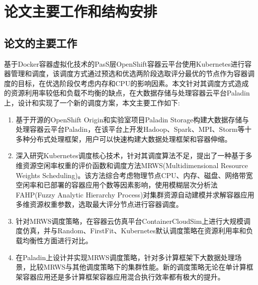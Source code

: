 \section{论文主要工作和结构安排}
\subsection{论文的主要工作}
基于Docker容器虚拟化技术的PasS层OpenShift容器云平台使用Kubernetes进行容器管理和调度，该调度方式通过预选和优选两阶段选取评分最优的节点作为容器调度的目标，在优选阶段仅考虑内存和CPU的影响因素。本文针对其调度方式造成的资源利用率较低和负载不均衡的缺点，在大数据存储与处理容器云平台Paladin上，设计和实现了一个新的调度方案，本文主要工作如下:
 \begin{enumerate}[(1)]
 \item 基于开源的OpenShift Origin和实验室项目Paladin Storage构建大数据存储与处理容器云平台Paladin，在该平台上开发Hadoop、Spark、MPI、Storm等十多种分布式处理框架，用户可以快速构建大数据处理框架和容器伸缩。
\item 深入研究Kubernetes调度核心技术，针对其调度算法不足，提出了一种基于多维资源空闲率权重的评价函数和调度方法MRWS(Multidimensional Resource Weights Scheduling)。该方法综合考虑物理节点CPU、内存、磁盘、网络带宽空闲率和已部署的容器应用个数等因素影响，使用模糊层次分析法FAHP(Fuzzy Analytic Hierarchy Process)对集群资源自动建模并求解容器应用多维资源权重参数，选取最大评分节点进行容器调度。
\item 针对MRWS调度策略，在容器云仿真平台ContainerCloudSim上进行大规模调度仿真，并与Random、FirstFit、Kubernetes默认调度策略在资源利用率和负载均衡性方面进行对比。
\item 在Paladin上设计并实现MRWS调度策略，针对多计算框架下大数据处理场景，比较MRWS与其他调度策略下的集群性能。新的调度策略无论在单计算框架容器应用还是多计算框架容器应用混合执行效率都有极大的提升。
\end{enumerate}

